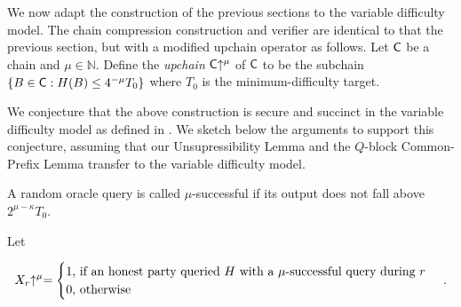 
We now adapt the construction of the previous sections to the variable
difficulty model.
%
The chain compression construction and verifier are identical to that the
previous section, but with a modified upchain operator as follows.
Let $\mathsf{C}$ be a chain and $\mu \in \mathbb{N}$.
Define the \emph{upchain} $\mathsf{C}\negthickspace\uparrow^\mu$ of $\mathsf{C}$ to be the
subchain $\{B \in \mathsf{C}: H(B) \leq 4^{-\mu} T_0\}$ where
$T_0$ is the minimum-difficulty target.



We conjecture that the above construction is secure and succinct in the
variable difficulty model as defined in \cite{varbackbone}. We sketch below the
arguments to support this conjecture, assuming that our Unsupressibility Lemma
and the $Q$-block Common-Prefix Lemma transfer to the variable difficulty model.


\begin{definition}[Superqueries]
A random oracle query is called $\mu$-successful if
its output does not fall above $2^{\mu - \kappa} T_0$.
\end{definition}

Let

\begin{align*}
X_r\negthickspace\uparrow^\mu = \begin{cases}
  1\text{, if an honest party queried $H$ with a $\mu$-successful query during $r$}\\
  0\text{, otherwise}
\end{cases}\,.
\end{align*}

